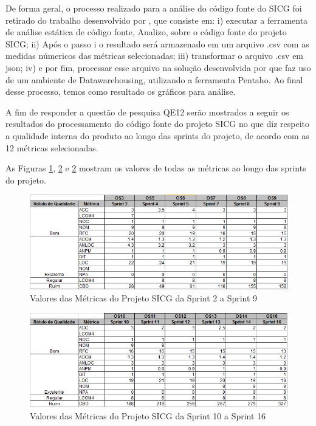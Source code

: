De forma geral, o processo realizado para a análise do código fonte do SICG foi retirado do trabalho desenvolvido por , que  consiste em: i) executar a ferramenta de análise estática de código fonte, Analizo, sobre o código fonte do projeto SICG; ii) Após o passo i o resultado será armazenado em um arquivo .csv com as medidas númericos das métricas selecionadas; iii) transformar o arquivo .csv em json; iv) e por fim, processar esse arquivo na solução desenvolvida por  que faz uso de um ambiente de Datawarehousing, utilizando a ferramenta Pentaho. Ao final desse processo, temos como resultado os gráficos para análise. 

\textcolor{red}{}


A fim de responder a questão de pesquisa QE12 serão mostrados a seguir os resultados do processamento do código fonte do projeto SICG no que diz respeito a qualidade interna do produto ao longo das sprints do projeto, de acordo com as 12 métricas selecionadas.

As Figuras \ref{metricasprint}, \ref{metricasprint2} e \ref{metricasprint2} mostram os valores de todas as métricas ao longo das sprints do projeto.

\textcolor{red}{}

\begin{figure}[H]
		\centering
			\includegraphics[scale=0.9]{figuras/metricas29.png}
		\caption{Valores das Métricas do Projeto SICG da Sprint 2 a Sprint 9}
		\label{metricasprint}
\end{figure}

\begin{figure}[H]
		\centering
			\includegraphics[scale=0.9]{figuras/metricas1016.png}
		\caption{Valores das Métricas do Projeto SICG da Sprint 10 a Sprint 16}
		\label{metricasprint2}
\end{figure}

